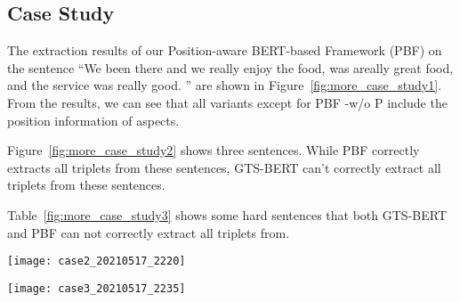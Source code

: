 \documentclass[11pt]{article}
\begin{document}
\subsection{Case Study}
The extraction results of our Position-aware BERT-based Framework (PBF) on the sentence ``We been there and we really enjoy the food, was areally great food, and the service was really good.
'' are shown in Figure~\ref{fig:more_case_study1}. From the results, we can see that all variants except for PBF -w/o P include the position information of aspects.

Figure~\ref{fig:more_case_study2} shows three sentences. While PBF correctly extracts all triplets from these sentences, GTS-BERT can't correctly extract all triplets from these sentences.

Table~\ref{fig:more_case_study3} shows some hard sentences that both GTS-BERT and PBF can not correctly extract all triplets from.

\begin{figure*}
	\centering
	\texttt{[image: case2\_20210517\_2220]}
	\caption{Case study. Red triplets are incorrect predictions.}
	\label{fig:more_case_study1}
\end{figure*}

\begin{figure*}
	\centering
	\texttt{[image: case3\_20210517\_2235]}
	\caption{Case study. Red triplets are incorrect predictions.}
	\label{fig:more_case_study2}
\end{figure*}
\end{document}
